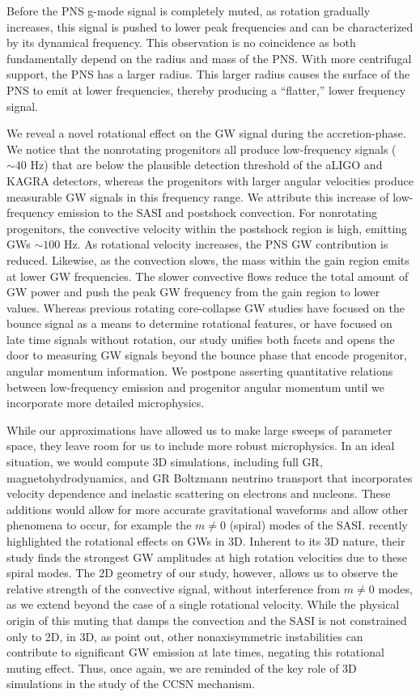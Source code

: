 \documentclass[twocolumn,times]{aastex62}  %
\begin{document}
Before the PNS g-mode signal is completely muted, as rotation gradually increases, this signal is pushed to lower peak frequencies and can be characterized by its dynamical frequency.  This observation is no coincidence as both  fundamentally depend on the radius and mass of the PNS.  With more centrifugal support, the PNS has a larger radius.  This larger radius causes the surface of the PNS to emit at lower frequencies, thereby producing a ``flatter,'' lower frequency signal.

We reveal a novel rotational effect on the GW signal during the accretion-phase.  We notice that the nonrotating progenitors all produce low-frequency signals ($\sim 40$ Hz) that are below the plausible detection threshold of the aLIGO and KAGRA detectors, whereas the progenitors with larger angular velocities produce measurable GW signals in this frequency range.  We attribute this increase of low-frequency emission to the SASI and postshock convection.  For nonrotating progenitors, the convective velocity within the postshock region is high, emitting GWs $\sim 100$ Hz.  As rotational velocity increases, the PNS GW contribution is reduced.  Likewise, as the convection slows, the mass within the gain region emits at lower GW frequencies.  The slower convective flows reduce the total amount of GW power and push the peak GW frequency from the gain region to lower values.  Whereas previous rotating core-collapse GW studies have focused on the bounce signal as a means to determine rotational features, or have focused on late time signals without rotation, our study unifies both facets and opens the door to measuring GW signals beyond the bounce phase that encode progenitor, angular momentum information. 
We postpone asserting quantitative relations between low-frequency emission and progenitor angular momentum until we incorporate more detailed microphysics.


While our approximations have allowed us to make large sweeps of parameter space, they leave room for us to include more robust microphysics.  In an ideal situation, we would compute 3D simulations, including full GR, magnetohydrodynamics, and GR Boltzmann neutrino transport that incorporates velocity dependence and inelastic scattering on electrons and nucleons.  These additions would allow for more accurate gravitational waveforms and allow other phenomena to occur, for example the $m\ne 0$ (spiral) modes of the SASI. \citet{andresen:2018} recently highlighted the rotational effects on GWs in 3D.  Inherent to its 3D nature, their study finds the strongest GW amplitudes at high rotation velocities due to these spiral modes.  The 2D geometry of our study, however, allows us to observe the relative strength of the convective signal, without interference from $m\ne 0$ modes, as we extend beyond the case of a single rotational velocity.
While the physical origin of this muting that damps the convection and the SASI is not constrained only to 2D, in 3D, as \citet{andresen:2018} point out, other nonaxisymmetric instabilities can contribute to significant GW emission at late times, negating this rotational muting effect.
Thus, once again, we are reminded of the key role of 3D simulations in the study of the CCSN mechanism.
\end{document}
